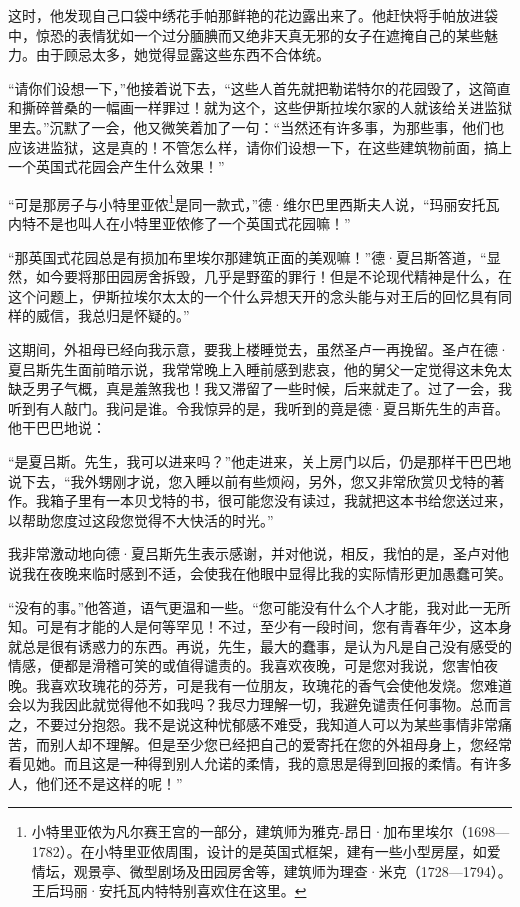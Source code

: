 \par 这时，他发现自己口袋中绣花手帕那鲜艳的花边露出来了。他赶快将手帕放进袋中，惊恐的表情犹如一个过分腼腆而又绝非天真无邪的女子在遮掩自己的某些魅力。由于顾忌太多，她觉得显露这些东西不合体统。
\par “请你们设想一下，”他接着说下去，“这些人首先就把勒诺特尔的花园毁了，这简直和撕碎普桑的一幅画一样罪过！就为这个，这些伊斯拉埃尔家的人就该给关进监狱里去。”沉默了一会，他又微笑着加了一句：“当然还有许多事，为那些事，他们也应该进监狱，这是真的！不管怎么样，请你们设想一下，在这些建筑物前面，搞上一个英国式花园会产生什么效果！”
\par “可是那房子与小特里亚侬\footnote{小特里亚侬为凡尔赛王宫的一部分，建筑师为雅克-昂日·加布里埃尔（1698—1782）。在小特里亚侬周围，设计的是英国式框架，建有一些小型房屋，如爱情坛，观景亭、微型剧场及田园房舍等，建筑师为理查·米克（1728—1794）。王后玛丽·安托瓦内特特别喜欢住在这里。}是同一款式，”德·维尔巴里西斯夫人说，“玛丽安托瓦内特不是也叫人在小特里亚侬修了一个英国式花园嘛！”
\par “那英国式花园总是有损加布里埃尔那建筑正面的美观嘛！”德·夏吕斯答道，“显然，如今要将那田园房舍拆毁，几乎是野蛮的罪行！但是不论现代精神是什么，在这个问题上，伊斯拉埃尔太太的一个什么异想天开的念头能与对王后的回忆具有同样的威信，我总归是怀疑的。”
\par 这期间，外祖母已经向我示意，要我上楼睡觉去，虽然圣卢一再挽留。圣卢在德·夏吕斯先生面前暗示说，我常常晚上入睡前感到悲哀，他的舅父一定觉得这未免太缺乏男子气概，真是羞煞我也！我又滞留了一些时候，后来就走了。过了一会，我听到有人敲门。我问是谁。令我惊异的是，我听到的竟是德·夏吕斯先生的声音。他干巴巴地说：
\par “是夏吕斯。先生，我可以进来吗？”他走进来，关上房门以后，仍是那样干巴巴地说下去，“我外甥刚才说，您入睡以前有些烦闷，另外，您又非常欣赏贝戈特的著作。我箱子里有一本贝戈特的书，很可能您没有读过，我就把这本书给您送过来，以帮助您度过这段您觉得不大快活的时光。”
\par 我非常激动地向德·夏吕斯先生表示感谢，并对他说，相反，我怕的是，圣卢对他说我在夜晚来临时感到不适，会使我在他眼中显得比我的实际情形更加愚蠢可笑。
\par “没有的事。”他答道，语气更温和一些。“您可能没有什么个人才能，我对此一无所知。可是有才能的人是何等罕见！不过，至少有一段时间，您有青春年少，这本身就总是很有诱惑力的东西。再说，先生，最大的蠢事，是认为凡是自己没有感受的情感，便都是滑稽可笑的或值得谴责的。我喜欢夜晚，可是您对我说，您害怕夜晚。我喜欢玫瑰花的芬芳，可是我有一位朋友，玫瑰花的香气会使他发烧。您难道会以为我因此就觉得他不如我吗？我尽力理解一切，我避免谴责任何事物。总而言之，不要过分抱怨。我不是说这种忧郁感不难受，我知道人可以为某些事情非常痛苦，而别人却不理解。但是至少您已经把自己的爱寄托在您的外祖母身上，您经常看见她。而且这是一种得到别人允诺的柔情，我的意思是得到回报的柔情。有许多人，他们还不是这样的呢！”
